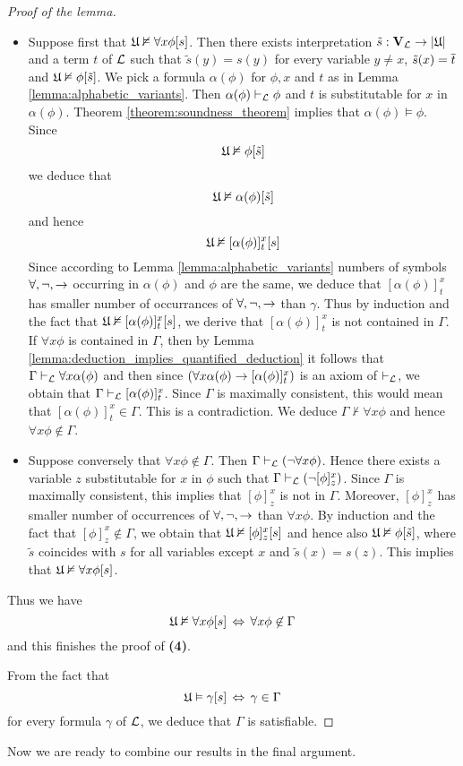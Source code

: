 \begin{proof}[Proof of the lemma]
\begin{enumerate}[label=\textbf{(\arabic*)}, leftmargin=3.0em]
\begin{itemize}
\item Suppose first that ${\mathfrak U} \nvDash \forall x\phi[s]$. Then there exists interpretation $\tilde{s}:\mathbf{V}_{{\mathcal L}} \rightarrow |{\mathfrak U}|$ and a term $t$ of ${\mathcal L}$ such that $\tilde{s}(y) = s(y)$ for every variable $y \neq x$, $\tilde{s}(x) = \overline{t}$ and ${\mathfrak U} \nvDash \phi[\tilde{s}]$. We pick a formula $\alpha(\phi)$ for $\phi, x$ and $t$ as in Lemma \ref{lemma:alphabetic_variants}. Then $\alpha(\phi) \vdash_{{\mathcal L}} \phi$ and $t$ is substitutable for $x$ in $\alpha(\phi)$. Theorem \ref{theorem:soundness_theorem} implies that $\alpha(\phi) \vDash \phi$. Since
$${\mathfrak U} \nvDash \phi[\tilde{s}]$$
we deduce that
$${\mathfrak U} \nvDash \alpha(\phi)[\tilde{s}]$$
and hence
$${\mathfrak U} \nvDash [\alpha(\phi)]^x_t[s]$$
Since according to Lemma \ref{lemma:alphabetic_variants} numbers of symbols $\forall , \neg, \rightarrow$ occurring in $\alpha(\phi)$ and $\phi$ are the same, we deduce that $[\alpha(\phi)]^x_t$ has smaller number of occurrances of $\forall , \neg, \rightarrow$ than $\gamma$. Thus by induction and the fact that ${\mathfrak U} \nvDash [\alpha(\phi)]^x_t[s]$, we derive that $[\alpha(\phi)]^x_t$ is not contained in $\Gamma$. If $\forall x \phi$ is contained in $\Gamma$, then by Lemma \ref{lemma:deduction_implies_quantified_deduction} it follows that $\Gamma \vdash_{{\mathcal L}} \forall x\alpha(\phi)$ and then since $(\forall x\alpha(\phi) \rightarrow [\alpha(\phi)]^x_t)$ is an axiom of $\vdash_{{\mathcal L}}$, we obtain that $\Gamma \vdash_{{\mathcal L}} [\alpha(\phi)]^x_t$. Since $\Gamma$ is maximally consistent, this would mean that $[\alpha(\phi)]^x_t \in \Gamma$. This is a contradiction. We deduce $\Gamma \nvdash \forall x\phi$ and hence $\forall x\phi \not \in \Gamma$.
\item Suppose conversely that $\forall x\phi \not \in  \Gamma$. Then $\Gamma \vdash_{{\mathcal L}} (\neg\forall x\phi)$. Hence there exists a variable $z$ substitutable for $x$ in $\phi$ such that $\Gamma \vdash_{{\mathcal L}} (\neg[\phi]^x_z)$. Since $\Gamma$ is maximally consistent, this implies that $[\phi]^x_z$ is not in $\Gamma$. Moreover, $[\phi]^x_z$ has smaller number of occurrences of $\forall , \neg, \rightarrow$ than $\forall x\phi$. By induction and the fact that $[\phi]^x_z \not \in  \Gamma$, we obtain that ${\mathfrak U} \nvDash [\phi]^x_z[s]$ and hence also ${\mathfrak U} \nvDash \phi[\tilde{s}]$, where $\tilde{s}$ coincides with $s$ for all variables except $x$ and $\tilde{s}(x) =
s(z)$. This implies that ${\mathfrak U} \nvDash \forall x\phi[s]$.
\end{itemize}
Thus we have
$${\mathfrak U} \nvDash \forall x\phi[s] \,\Leftrightarrow\, \forall x\phi \not \in \Gamma$$
and this finishes the proof of \textbf{(4)}.
\end{enumerate}
From the fact that
$${\mathfrak U} \vDash \gamma[s] \,\Leftrightarrow\, \gamma \in \Gamma$$
for every formula $\gamma$ of ${\mathcal L}$, we deduce that $\Gamma$ is satisfiable.
\end{proof}
\noindent
Now we are ready to combine our results in the final argument.

